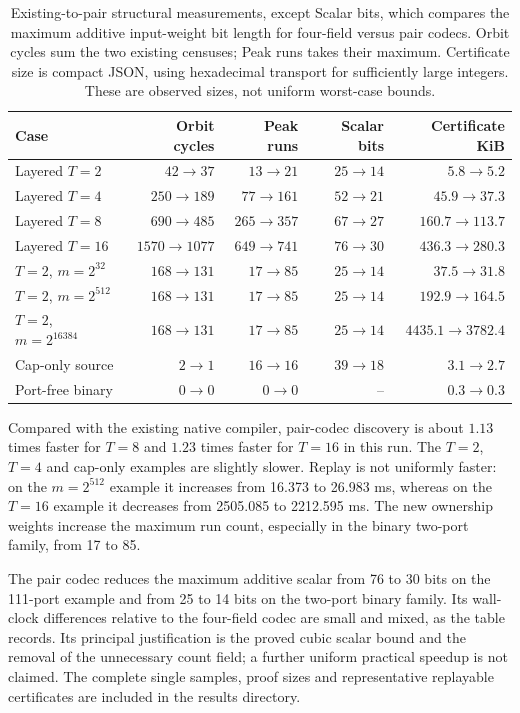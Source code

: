 \begin{table}[H]
\centering\small
\setlength{\tabcolsep}{4pt}
\begin{tabular}{lrrrr}
\toprule
Case & Orbit cycles & Peak runs & Scalar bits & Certificate KiB\\
\midrule
Layered $T=2$ & $42\to 37$ & $13\to 21$ & $25\to 14$ & $5.8\to 5.2$ \\
Layered $T=4$ & $250\to 189$ & $77\to 161$ & $52\to 21$ & $45.9\to 37.3$ \\
Layered $T=8$ & $690\to 485$ & $265\to 357$ & $67\to 27$ & $160.7\to 113.7$ \\
Layered $T=16$ & $1570\to 1077$ & $649\to 741$ & $76\to 30$ & $436.3\to 280.3$ \\
$T=2$, $m=2^{32}$ & $168\to 131$ & $17\to 85$ & $25\to 14$ & $37.5\to 31.8$ \\
$T=2$, $m=2^{512}$ & $168\to 131$ & $17\to 85$ & $25\to 14$ & $192.9\to 164.5$ \\
$T=2$, $m=2^{16384}$ & $168\to 131$ & $17\to 85$ & $25\to 14$ & $4435.1\to 3782.4$ \\
Cap-only source & $2\to 1$ & $16\to 16$ & $39\to 18$ & $3.1\to 2.7$ \\
Port-free binary & $0\to 0$ & $0\to 0$ & -- & $0.3\to 0.3$ \\
\bottomrule
\end{tabular}
\caption{Existing-to-pair structural measurements, except Scalar bits,
which compares the maximum additive input-weight bit length for
four-field versus pair codecs.  Orbit cycles sum the two existing censuses;
Peak runs takes their maximum.  Certificate size is compact JSON, using
hexadecimal transport for sufficiently large integers.  These are observed
sizes, not uniform worst-case bounds.}
\label{tab:native-moment-structure}
\end{table}

Compared with the existing native compiler, pair-codec discovery is about
$1.13$ times faster for $T=8$ and $1.23$ times faster for $T=16$ in this run.
The $T=2$, $T=4$ and cap-only examples are slightly slower.  Replay is not
uniformly faster: on the $m=2^{512}$ example it increases from 16.373 to
26.983 ms, whereas on the $T=16$ example it decreases from 2505.085 to
2212.595 ms.  The new ownership weights increase the maximum run count,
especially in the binary two-port family, from 17 to 85.

The pair codec reduces the maximum additive scalar from 76 to 30 bits
on the 111-port example and from 25 to 14 bits on the two-port binary
family.  Its wall-clock differences relative to the four-field codec are
small and mixed, as the table records.  Its principal justification is the
proved cubic scalar bound and the removal of the unnecessary count field;
a further uniform practical speedup is not claimed.  The complete single
samples, proof sizes and representative replayable certificates are
included in the results directory.

